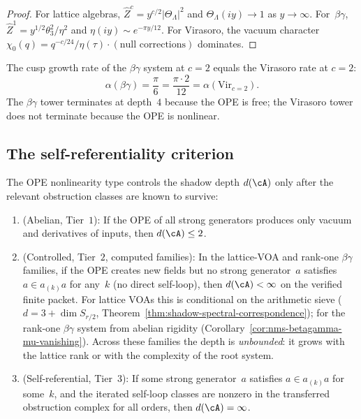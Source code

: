 \begin{proof}
For lattice algebras,
$\widehat{Z}^c=y^{c/2}\lvert\Theta_\Lambda\rvert^2$ and
$\Theta_\Lambda(iy)\to1$ as $y\to\infty$. For~$\beta\gamma$,
$\widehat{Z}^1=y^{1/2}\theta_3^2/\eta^2$ and
$\eta(iy)\sim e^{-\pi y/12}$. For Virasoro, the vacuum character
$\chi_0(q)=q^{-c/24}/\eta(\tau)\cdot(\text{null corrections})$
dominates.
\end{proof}

\begin{theorem}
\label{thm:bg-vir-coincidence}
\ClaimStatusProvedElsewhere
The cusp growth rate of the $\beta\gamma$ system at $c=2$
equals the Virasoro rate at $c=2$:
\[
 \alpha(\beta\gamma)
 = \frac{\pi}{6}
 = \frac{\pi\cdot 2}{12}
 = \alpha(\mathrm{Vir}_{c=2}).
\]
The $\beta\gamma$ tower terminates at depth~$4$ because the OPE is
free; the Virasoro tower does not terminate because the OPE is
nonlinear.
\end{theorem}

\subsection{The self-referentiality criterion}

\begin{proposition}
\label{prop:self-referentiality-criterion}
\label{prop:free-interacting-dichotomy}
The OPE nonlinearity type controls the shadow depth $d(\cA)$ only after
the relevant obstruction classes are known to survive:
\begin{enumerate}[label=\textup{(\roman*)}]
\item \textup{(Abelian, Tier~$1$):}
 If the OPE of all strong generators produces only vacuum and
 derivatives of inputs, then $d(\cA) \leq 2$.
\item \textup{(Controlled, Tier~$2$, computed families):}
 In the lattice-VOA and rank-one $\beta\gamma$ families, if the OPE
 creates new fields but no strong generator~$a$ satisfies
 $a \in a_{(k)}a$ for any~$k$ \textup{(}no direct self-loop\textup{)},
 then $d(\cA) < \infty$ on the verified finite packet. For lattice VOAs
 this is conditional on the arithmetic sieve
 \textup{(}$d = 3 + \dim S_{r/2}$,
 Theorem~\textup{\ref{thm:shadow-spectral-correspondence})}; for the
 rank-one $\beta\gamma$ system from abelian rigidity
 \textup{(}Corollary~\textup{\ref{cor:nms-betagamma-mu-vanishing})}.
 Across these families the depth is \emph{unbounded}: it grows
 with the lattice rank or with the complexity of the root system.
\item \textup{(Self-referential, Tier~$3$):}
 If some strong generator~$a$ satisfies $a \in a_{(k)}a$ for some~$k$,
 and the iterated self-loop classes are nonzero in the transferred
 obstruction complex for all orders, then $d(\cA) = \infty$.
\end{enumerate}
\end{proposition}

